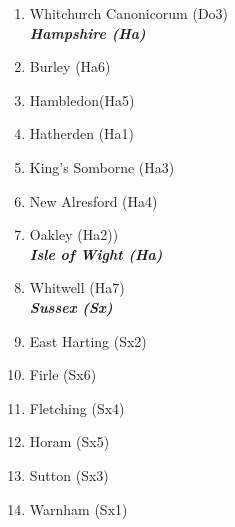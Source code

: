 \begin{refsection}
\begin{multicols}{2}
\begin{enumerate}
	   \item Whitchurch Canonicorum (Do3)\\
	   \emph{\textbf{Hampshire (Ha)}}			
	   \item Burley (Ha6)	
	   \item Hambledon(Ha5)	
	   \item Hatherden (Ha1)	
	   \item King's Somborne (Ha3)	
	   \item New Alresford (Ha4)	
	   \item Oakley (Ha2))\\
	   \emph{\textbf{Isle of Wight (Ha)}}				
	   \item Whitwell (Ha7)\\
	   \emph{\textbf{Sussex (Sx)}}	
	   \item East Harting (Sx2)	
	   \item Firle (Sx6)	
	   \item Fletching (Sx4)	
	   \item Horam (Sx5)	
	   \item Sutton (Sx3)	
	   \item Warnham (Sx1)
	\end{enumerate}
	\end{multicols}
\end{refsection}
